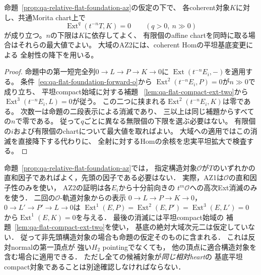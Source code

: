 \begin{corollary}[相対AZ判定での高次Extの消滅範囲]
\label{cor:qa-relative-az-local-eventual-ext}
命題~\ref{prop:qa-relative-flat-foundation-az}の仮定の下で、
各coherent対象$K$に対し、共通Morita chart上で
\[
 \operatorname{Ext}^q(t^{-n}T,K)=0
 \qquad(q>0,\ n\gg0)
\]
が成り立つ。$n$の下限は$K$に依存してよく、
有限個のaffine chartを同時に取る場合はそれらの最大値でよい。
大域のAZ2には、coherent Homの平坦基底変更による
全射性の降下を用いる。
\end{corollary}
\begin{proof}
命題中の第一短完全列$0\to L\to P\to K\to0$に
$\operatorname{Ext}(t^{-n}E_i,-)$を適用する。
条件~\eqref{eq:qa-flat-foundation-forward-o}から
$\operatorname{Ext}^2(t^{-n}E_i,P)=0$が$n\gg0$で成り立ち、
平坦compact始域に対する補題~
\ref{lem:qa-flat-compact-ext-two}から
$\operatorname{Ext}^3(t^{-n}E_i,L)=0$が従う。
この二つに挟まれる$\operatorname{Ext}^2(t^{-n}E_i,K)$は零である。
次数一は命題の二段表示による消滅であり、
三以上は同じ補題からすべての$n$で零である。
従って$q$ごとに異なる無限個の下限を選ぶ必要はない。
有限個の$i$および有限個のchartについて最大値を取ればよい。
大域への適用ではこの消滅を直接降下する代わりに、
全射に対するHomの余核を忠実平坦拡大で検査する。
\end{proof}

\begin{remark}[AZ生成における構造対象の位置と二段presentation]
\label{rem:qa-relative-az-noninitial-structure}
命題~\ref{prop:qa-relative-flat-foundation-az}では，
指定構造対象$\mathcal O$が$T$のいずれかの
直和因子であればよく，先頭の因子である必要はない．
実際，AZ1は$\mathcal O$の直和因子性のみを使い，
AZ2の証明は各$E_i$から十分前向きの
$t^m\mathcal O$への高次Ext消滅のみを使う．
二回の$\mathcal O$-軌道対象からの表示
$0\to L\to P\to K\to0$，
$0\to L'\to P'\to L\to0$は
$\operatorname{Ext}^1(E,P)=
 \operatorname{Ext}^2(E,P')=
 \operatorname{Ext}^3(E,L')=0$
から$\operatorname{Ext}^1(E,K)=0$を与える．
最後の消滅には平坦compact始域の
補題~\ref{lem:qa-flat-compact-ext-two}を使い，
基底の絶対大域次元二は仮定していない．
従って非先頭構造対象の場合も命題の仮定そのものに含まれる．
これは反対normalの第一頂点が
強い$H_2$ pointingでなくても，
他の頂点に適合構造対象を含む場合に適用できる．
ただし全ての候補対象が\emph{同じ相対heart}の
基底平坦compact対象であることは別途確認しなければならない．
\end{remark}


